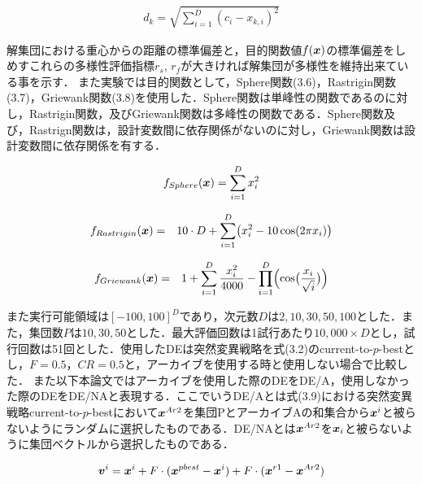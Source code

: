 \documentclass[a4paper,11pt,oneside,openany]{jsbook}
\def\vector#1{\mbox{\boldmath $#1$}}
\begin{document}
\begin{eqnarray}
d_{k} = \sqrt{\sum_{i=1}^{D} (c_i - x_{k,i})^2}
\end{eqnarray}

解集団における重心からの距離の標準偏差と，目的関数値$f(\vector{x})$の標準偏差をしめすこれらの多様性評価指標$r_s$, $r_f$が大きければ解集団が多様性を維持出来ている事を示す．
また実験では目的関数として，Sphere関数(3.6)，Rastrigin関数(3.7)，Griewank関数(3.8)を使用した．Sphere関数は単峰性の関数であるのに対し，Rastrigin関数，及びGriewank関数は多峰性の関数である．Sphere関数及び，Rastrign関数は，設計変数間に依存関係がないのに対し，Griewank関数は設計変数間に依存関係を有する．

\begin{eqnarray}
  f_{Sphere}(\vector{x}) = \sum_{i=1}^D x_i^2
\end{eqnarray}

\begin{eqnarray}
f_{Rastrigin}(\vector{x}) &=& 10\cdot D+\sum_{i=1}^{D}\bigl( x_i^2-10\cos( 2\pi x_i) \bigr) \label{rastrigin}
\end{eqnarray}

\begin{eqnarray} f_{Griewank}(\vector{x}) & = & 1+\sum_{i=1}^{D}\frac{x_i^2}{4000}-\prod_{i=1}^{D} \Bigl(\cos
\bigl(\frac{x_i}{\sqrt{i}} \bigr) \Bigr) \label{griewank}
\end{eqnarray}

また実行可能領域は$[-100, 100]^D$であり，次元数$D$は$2,10,30,50,100$とした．また，集団数$P$は$10,30,50$とした．最大評価回数は1試行あたり$10,000 \times D$とし，試行回数は51回とした．使用したDEは突然変異戦略を式(3.2)のcurrent-to-$p$-bestとし，$F=0.5$，$CR=0.5$と，アーカイブを使用する時と使用しない場合で比較した．
また以下本論文ではアーカイブを使用した際のDEをDE/A，使用しなかった際のDEをDE/NAと表現する．ここでいうDE/Aとは式(3.9)における突然変異戦略current-to-$p$-bestにおいて$\vector{x}^{Ar2}$を集団PとアーカイブAの和集合から${\vector{x}^i}$と被らないようにランダムに選択したものである．DE/NAとは$\vector{x}^{Ar2}$を$\vector{x}_{i}$と被らないように集団ベクトルから選択したものである．

\begin{eqnarray}
\vector{v}^{i} = \vector{x}^{i} + F\cdot(\vector{x}^{pbest} - \vector{x}^{i}) + F\cdot(\vector{x}^{r1} - \vector{x}^{Ar2})
\end{eqnarray}



\end{document}
